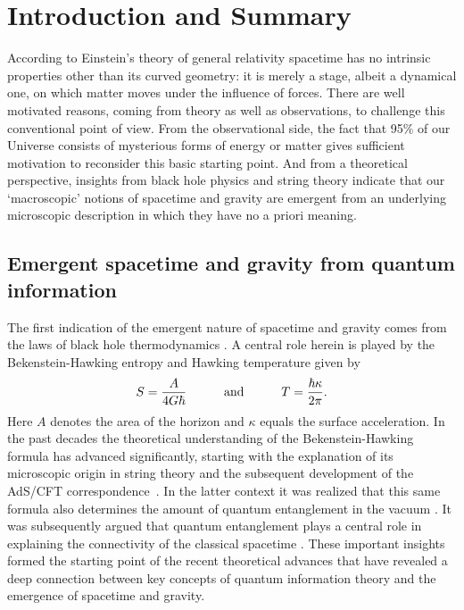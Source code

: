 \documentclass[a4paper,12pt]{article}
\newcommand{\be}{\begin{equation}}
\newcommand{\ee}{\end{equation}}
\begin{document}
\date{\today}

\section{Introduction and Summary}

According to Einstein's theory of general relativity  spacetime has  no intrinsic properties other than its curved geometry: it is merely a stage, albeit a dynamical one, on which matter moves under the influence of forces. There are well motivated reasons, coming from theory as well as observations, to challenge this conventional point of view. From the observational side, the fact that 95$\%$ of our Universe consists of mysterious forms of energy or matter gives sufficient motivation to reconsider this basic starting point. And from a theoretical perspective, insights from black hole physics and string theory indicate that our `macroscopic' notions of spacetime and gravity are emergent from an underlying microscopic description in which they have no a priori meaning. 

\subsection{Emergent spacetime and gravity from quantum information}
The first indication of the emergent nature of spacetime and gravity comes from the laws of black hole thermodynamics \cite{Bardeen}. A central role herein is played by the Bekenstein-Hawking entropy \cite{Bekenstein,Hawking} and Hawking temperature  \cite{Davies,Unruh} given by
\be
\label{BH-ent}
S 
= {A
\over 4G\hbar} 
\qquad\quad\mbox{and}\qquad\quad
T= {\hbar \kappa\over 2\pi}.
\ee
Here $A$ denotes the area of the horizon and  $\kappa$ equals the surface acceleration.  
In the past decades the theoretical understanding of the Bekenstein-Hawking formula 
has advanced significantly, starting with the explanation of its 
microscopic origin in string theory \cite{StromVafa} and the subsequent 
development of the AdS/CFT correspondence~\cite{AdS-CFT}.  In the latter context it was realized that this same formula also determines the amount of quantum entanglement in the vacuum 
\cite{RyuTakayanagi}. It was subsequently argued that   quantum entanglement plays a central 
role in explaining the connectivity of the classical spacetime \cite{vanRaamsdonk}. These 
important insights formed the starting point of the recent theoretical advances that have revealed 
a deep connection between key concepts of quantum information theory and the 
emergence of spacetime and gravity. 
\end{document}
